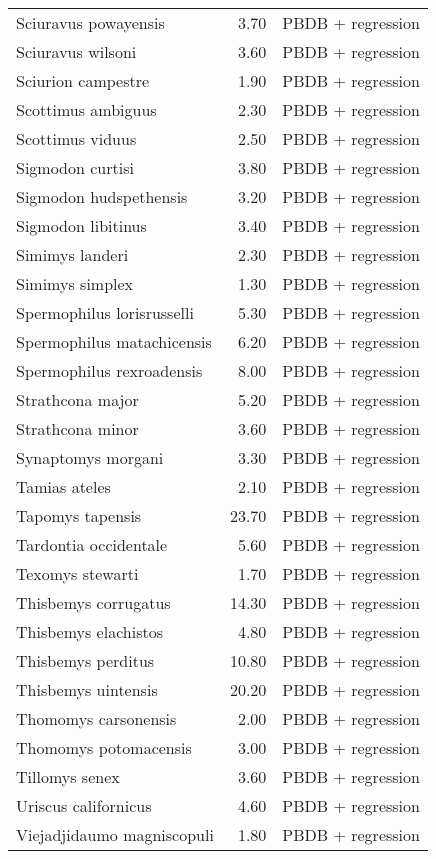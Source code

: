 \begin{table}[ht]
\begin{tabular}{lrl}
  Sciuravus powayensis & 3.70 & PBDB + regression \\ 
  Sciuravus wilsoni & 3.60 & PBDB + regression \\ 
  Sciurion campestre & 1.90 & PBDB + regression \\ 
  Scottimus ambiguus & 2.30 & PBDB + regression \\ 
  Scottimus viduus & 2.50 & PBDB + regression \\ 
  Sigmodon curtisi & 3.80 & PBDB + regression \\ 
  Sigmodon hudspethensis & 3.20 & PBDB + regression \\ 
  Sigmodon libitinus & 3.40 & PBDB + regression \\ 
  Simimys landeri & 2.30 & PBDB + regression \\ 
  Simimys simplex & 1.30 & PBDB + regression \\ 
  Spermophilus lorisrusselli & 5.30 & PBDB + regression \\ 
  Spermophilus matachicensis & 6.20 & PBDB + regression \\ 
  Spermophilus rexroadensis & 8.00 & PBDB + regression \\ 
  Strathcona major & 5.20 & PBDB + regression \\ 
  Strathcona minor & 3.60 & PBDB + regression \\ 
  Synaptomys morgani & 3.30 & PBDB + regression \\ 
  Tamias ateles & 2.10 & PBDB + regression \\ 
  Tapomys tapensis & 23.70 & PBDB + regression \\ 
  Tardontia occidentale & 5.60 & PBDB + regression \\ 
  Texomys stewarti & 1.70 & PBDB + regression \\ 
  Thisbemys corrugatus & 14.30 & PBDB + regression \\ 
  Thisbemys elachistos & 4.80 & PBDB + regression \\ 
  Thisbemys perditus & 10.80 & PBDB + regression \\ 
  Thisbemys uintensis & 20.20 & PBDB + regression \\ 
  Thomomys carsonensis & 2.00 & PBDB + regression \\ 
  Thomomys potomacensis & 3.00 & PBDB + regression \\ 
  Tillomys senex & 3.60 & PBDB + regression \\ 
  Uriscus californicus & 4.60 & PBDB + regression \\ 
  Viejadjidaumo magniscopuli & 1.80 & PBDB + regression \\ 

\end{tabular}
\end{table}
